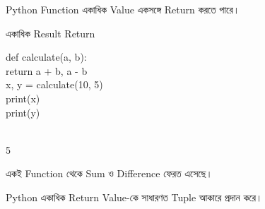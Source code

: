 

Python Function একাধিক Value একসঙ্গে Return করতে পারে।

\begin{codeoutputbox}{একাধিক Result Return}

\noindent
\begin{minipage}[t]{0.55\linewidth}
\codeheading

\begin{english}
\ttfamily
def calculate(a, b):\\
\hspace*{4mm}return a + b, a - b\\[0.5mm]
x, y = calculate(10, 5)\\
print(x)\\
print(y)
\end{english}

\end{minipage}
\hfill
\begin{minipage}[t]{0.41\linewidth}
\outputheading

\begin{english}
\\
5
\end{english}

\medskip

একই Function থেকে Sum ও Difference ফেরত এসেছে।

Python একাধিক Return Value-কে সাধারণত Tuple আকারে প্রদান করে।

\end{minipage}

\end{codeoutputbox}



